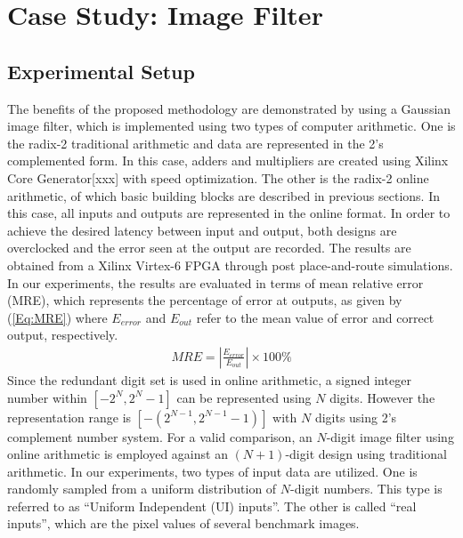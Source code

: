 \documentclass{acm_proc_article-sp}
\begin{document}
\section{Case Study: Image Filter}
\subsection{Experimental Setup}
The benefits of the proposed methodology are demonstrated by using a Gaussian image filter, which is implemented using two types of computer arithmetic. One is the radix-2 traditional arithmetic and data are represented in the 2's complemented form. In this case, adders and multipliers are created using Xilinx Core Generator[xxx] with speed optimization. The other is the radix-2 online arithmetic, of which basic building blocks are described in previous sections. In this case, all inputs and outputs are represented in the online format. In order to achieve the desired latency between input and output, both designs are overclocked and the error seen at the output are recorded. The results are obtained from a Xilinx Virtex-6 FPGA through post place-and-route simulations. In our experiments, the results are evaluated in terms of mean relative error (MRE), which represents the percentage of error at outputs, as given by (\ref{Eq:MRE}) where $E_{error}$ and $E_{out}$ refer to the mean value of error and correct output, respectively.
%
\begin{eqnarray}\label{Eq:MRE}
  MRE=\left|\frac{E_{error}}{E_{out}}\right|\times100\%
\end{eqnarray}
%
Since the redundant digit set is used in online arithmetic, a signed integer number within $[-2^N,2^N-1]$ can be represented using $N$ digits. However the representation range is $[-(2^{N-1},2^{N-1}-1)]$ with $N$ digits using 2's complement number system. For a valid comparison, an $N$-digit image filter using online arithmetic is employed against an $(N+1)$-digit design using traditional arithmetic. In our experiments, two types of input data are utilized. One is randomly sampled from a uniform distribution of $N$-digit numbers. This type is referred to as ``Uniform Independent (UI) inputs''. The other is called ``real inputs'', which are the pixel values of several benchmark images.
\end{document}
